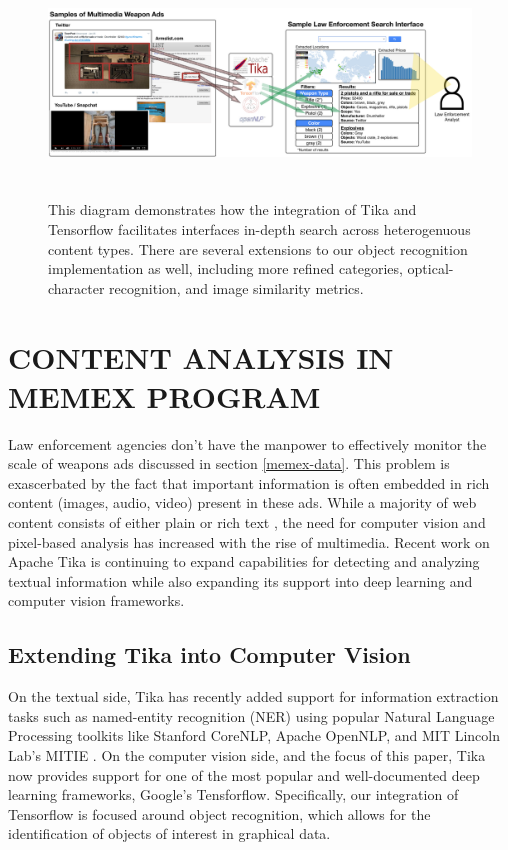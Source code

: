 \begin{figure}
	\includegraphics[width=\textwidth,height=6cm]{interface-diagram}
	\caption{This diagram demonstrates how the integration of Tika and Tensorflow facilitates interfaces in-depth search across heterogenuous content types. There are several extensions to our object recognition implementation as well, including more refined categories, optical-character recognition, and image similarity metrics.}
	\label{fig:interface-diagram}
\end{figure}

\section{CONTENT ANALYSIS IN MEMEX PROGRAM} \label{sec:memex}
Law enforcement agencies don't have the manpower to effectively monitor the scale of weapons ads discussed in section \ref{memex-data}. This problem is exascerbated by the fact that important information is often embedded in rich content (images, audio, video) present in these ads. While a majority of web content consists of either plain or rich text \cite{mphillips-EOT2012}, the need for computer vision and pixel-based analysis has increased with the rise of multimedia. Recent work on Apache Tika is continuing to expand capabilities for detecting and analyzing textual information while also expanding its support into deep learning and computer vision frameworks. 

\subsection{Extending Tika into Computer Vision}

On the textual side, Tika has recently added support for information extraction tasks such as named-entity recognition (NER) using popular Natural Language Processing toolkits like Stanford CoreNLP\cite{Finkel:2005:INI:1219840.1219885}, Apache OpenNLP\cite{ApacheOpenNLP}, and MIT Lincoln Lab's MITIE \cite{MITIE-github}. On the computer vision side, and the focus of this paper, Tika now provides support for one of the most popular and well-documented deep learning frameworks, Google's Tensforflow. Specifically, our integration of Tensorflow is focused around object recognition, which allows for the identification of objects of interest in graphical data. 

